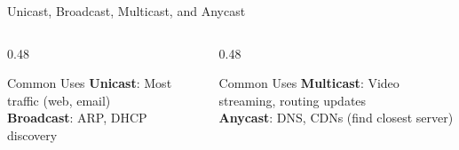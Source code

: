\documentclass[aspectratio=169]{beamer}  %
\begin{document}
\begin{frame}{Unicast, Broadcast, Multicast, and Anycast}
    \vspace{0.3em}
    \begin{columns}[T]
        \begin{column}{0.48\textwidth}
            \begin{block}{Common Uses}
                \small
                \textbf{Unicast}: Most traffic (web, email) \\
                \textbf{Broadcast}: ARP, DHCP discovery
            \end{block}
        \end{column}
        \begin{column}{0.48\textwidth}
            \begin{block}{Common Uses}
                \small
                \textbf{Multicast}: Video streaming, routing updates \\
                \textbf{Anycast}: DNS, CDNs (find closest server)
            \end{block}
        \end{column}
    \end{columns}
\end{frame}
\end{document}
